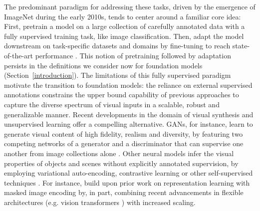 The predominant paradigm for addressing these tasks, driven by the emergence of ImageNet \cite{deng2009imagenet} during the early 2010s, tends to center around a familiar core idea: First, pretrain a model on a large collection of carefully annotated data \cite{russakovsky2015imagenet} with a fully supervised training task, like image classification. Then, adapt the model downstream on task-specific datasets and domains \cite{lin2014microsoft, chen2015microsoft, antol2015vqa} by fine-tuning to reach state-of-the-art performance \cite{krizhevsky2012imagenet, simonyan2015verydeep, he2016deep, xu2016ask}. This notion of pretraining followed by adaptation persists in the definitions we consider now for foundation models (Section~\ref{introduction}).
The limitations of this fully supervised paradigm motivate the transition to foundation models: the reliance on external supervised annotations constrains the upper bound capability of previous approaches to capture the diverse spectrum of visual inputs in a scalable, robust and generalizable manner. Recent developments in the domain of visual synthesis and unsupervised learning offer a compelling alternative. GANs, for instance, learn to generate visual content of high fidelity, realism and diversity, by featuring two competing networks of a generator and a discriminator that can supervise one another from image collections alone \citep[e.g. ][]{goodfellow2014gan,ganformer}. Other neural models infer the visual properties of objects and scenes without explicitly annotated supervision, by employing variational auto-encoding, contrastive learning or other self-supervised techniques \citep[e.g. ][]{Kingma2014AutoEncodingVB, chen2020simclr, He2020MomentumCF}. For instance, \citet{he2021masked} build upon prior work on representation learning with masked image encoding \citep[e.g. ][]{pathak2016context,vincent2008denoise} by, in part, combining recent advancements in flexible architectures (e.g. vision transformers \cite{Dosovitskiy2021AnII, zhai2021scaling}) with increased scaling.

